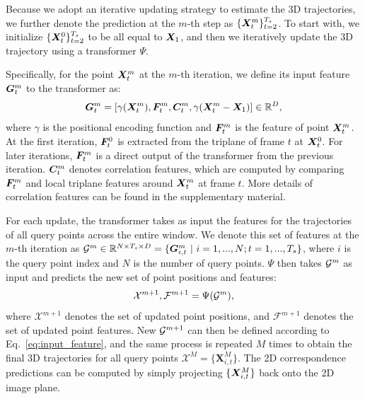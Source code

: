 Because we adopt an iterative updating strategy to estimate the 3D trajectories, we further denote the prediction at the $m$-th step as $\{\bm{X}_t^m\}_{t=2}^{T_s}$. To start with, we initialize $\{\bm{X}_t^0\}_{t=2}^{T_s}$ to be all equal to $\bm{X}_1$, and then we iteratively update the 3D trajectory using a transformer $\Psi$.

Specifically, for the point $\bm{X}_t^m$ at the $m$-th iteration, we define its input feature $\bm{G}_t^m$ to the transformer as:
\begin{equation}
    \bm{G}_t^m = [\gamma(\bm{X}_t^m), \bm{F}_t^m, \bm{C}_t^m, \gamma(\bm{X}_t^m - \bm{X}_1)] \in \mathbb{R}^D,
    \label{eq:input_feature}
\end{equation}
where $\gamma$ is the positional encoding function and $\bm{F}_t^m$ is the feature of point $\bm{X}_t^m$. At the first iteration, $\bm{F}_t^0$ is extracted from the triplane of frame $t$ at $\bm{X}_t^0$.
For later iterations, $\bm{F}_t^m$ is a direct output of the transformer from the previous iteration. $\bm{C}_t^m$ denotes correlation features, which are computed by comparing $\bm{F}_t^m$ and local triplane features around $\bm{X}_t^m$ at frame $t$.
More details of correlation features can be found in the supplementary material.

For each update, the transformer takes as input the features for the trajectories of all query points across the entire window. We denote this set of features at the $m$-th iteration as $\mathcal{G}^{m} \in \mathbb{R}^{N\times T_s\times D}  = \{\bm{G}_{i,t}^m \ | \ i=1, ..., N; t=1, ..., T_s\}$, where $i$ is the query point index and $N$ is the number of query points. $\Psi$ then takes $\mathcal{G}^{m}$ as input and predicts the new set of point positions and features:
\begin{equation}
    \mathcal{X}^{m+1}, \mathcal{F}^{m+1} = \Psi(\mathcal{G}^{m}), 
\end{equation}
where $\mathcal{X}^{m+1}$ denotes the set of updated point positions, and $\mathcal{F}^{m+1}$ denotes the set of updated point features. New $\mathcal{G}^{m+1}$ can then be defined according to Eq.~\ref{eq:input_feature}, and the same process is repeated $M$ times to obtain the final 3D trajectories for all query points $\mathcal{X}^M=\{\bm{X}_{i,t}^M\}$.
The 2D correspondence predictions can be computed by simply projecting $\{\bm{X}_{i,t}^M\}$ back onto the 2D image plane.

